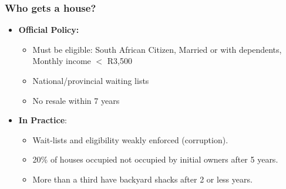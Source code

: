 \documentclass[aspectratio=149]{beamer}
\begin{document}
  

\begin{frame}
\frametitle{Who gets a house?}
  \begin{itemize}
    \item<1-> {\bf Official Policy:}
    \vspace{2mm} 
      \begin{itemize}
        \item Must be eligible: South African Citizen, Married or with dependents, Monthly income $<$ R3,500
        \vspace{1mm}
        \item National/provincial waiting lists
        \vspace{1mm}
        \item No resale within 7 years
      \end{itemize}
    \vspace{2mm}
    \item<2-> {\bf In Practice}:
      \begin{itemize}
        \vspace{2mm} 
        \item Wait-lists and eligibility weakly enforced (corruption).
        \vspace{1mm}
        \item 20\% of houses occupied not occupied by initial owners after 5 years.
        \vspace{1mm}
        \item More than a third have backyard shacks after 2 or less years.
      \end{itemize}
  \end{itemize}

\end{frame}

\end{document}
